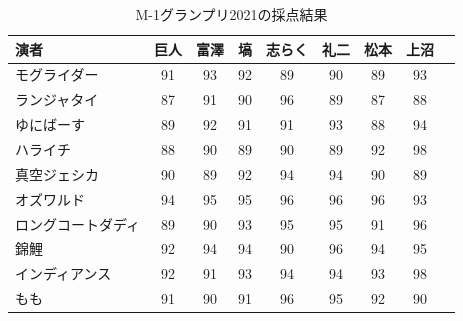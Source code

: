 \begin{table}[ht]
	\centering
	\caption{M-1グランプリ2021の採点結果}
	\begin{tabular}{l|cccccccc}
		\hline
		演者        & 巨人 & 富澤 & 塙  & 志らく & 礼二 & 松本 & 上沼 \\
		\hline
		モグライダー    & 91 & 93 & 92 & 89  & 90 & 89 & 93 \\
		ランジャタイ    & 87 & 91 & 90 & 96  & 89 & 87 & 88 \\
		ゆにばーす     & 89 & 92 & 91 & 91  & 93 & 88 & 94 \\
		ハライチ      & 88 & 90 & 89 & 90  & 89 & 92 & 98 \\
		真空ジェシカ    & 90 & 89 & 92 & 94  & 94 & 90 & 89 \\
		オズワルド     & 94 & 95 & 95 & 96  & 96 & 96 & 93 \\
		ロングコートダディ & 89 & 90 & 93 & 95  & 95 & 91 & 96 \\
		錦鯉        & 92 & 94 & 94 & 90  & 96 & 94 & 95 \\
		インディアンス   & 92 & 91 & 93 & 94  & 94 & 93 & 98 \\
		もも        & 91 & 90 & 91 & 96  & 95 & 92 & 90 \\
		\hline
	\end{tabular}
	\label{tbl:x15_m1}
\end{table}

